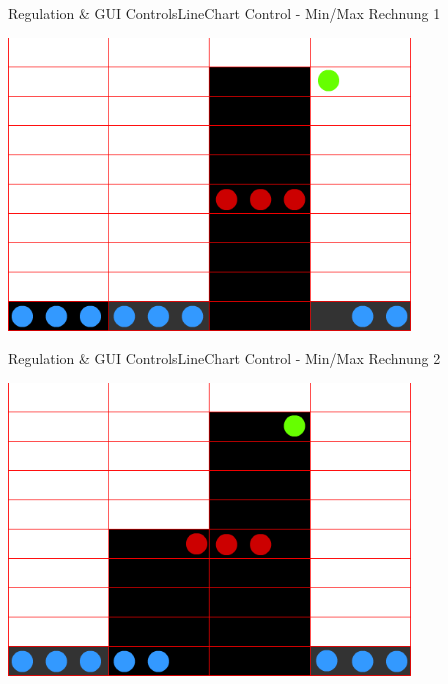 	\begin{frame}{Regulation \& GUI Controls}{LineChart Control - Min/Max Rechnung 1}
	\begin{center}			
		\includegraphics[width=0.8\textwidth]{../regulation/TooManySamples030001.png}
	\end{center}
	\end{frame}
	
	\begin{frame}{Regulation \& GUI Controls}{LineChart Control - Min/Max Rechnung 2}
	\begin{center}			
		\includegraphics[width=0.8\textwidth]{../regulation/TooManySamples030002.png}
	\end{center}
	\end{frame}
	
